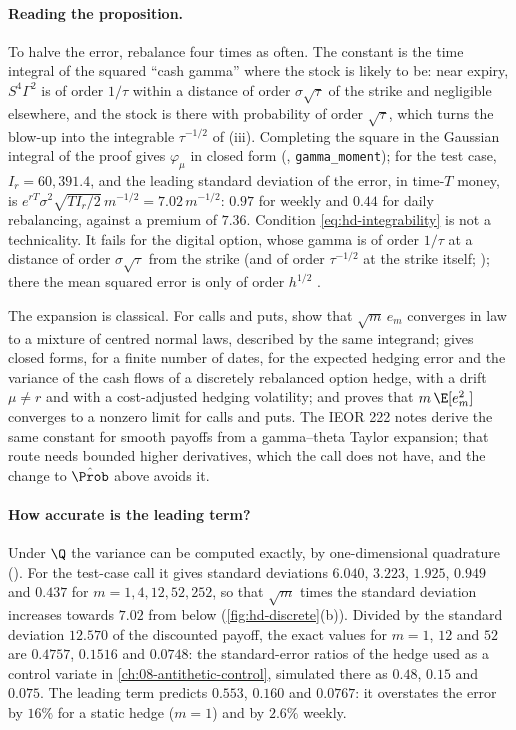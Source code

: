 \paragraph{Reading the proposition.} To halve the error, rebalance four times as often. The
constant is the time integral of the squared ``cash gamma'' where the stock is likely to be:
near expiry, $S^4\Gamma^2$ is of order $1/\tau$ within a distance of order $\sigma\sqrt\tau$ of the
strike and negligible elsewhere, and the stock is there with probability of order
$\sqrt\tau$, which turns the blow-up into the integrable $\tau^{-1/2}$ of (iii). Completing the
square in the Gaussian integral of the proof gives $\varphi_\mu$ in closed form
(, \texttt{gamma\_moment}); for the test case,
$I_r=60{,}391.4$, and the leading standard deviation of the error, in time-$T$ money, is
$e^{rT}\sigma^2\sqrt{TI_r/2}\,m^{-1/2}=7.02\,m^{-1/2}$: $0.97$ for weekly and $0.44$ for daily
rebalancing, against a premium of $7.36$. Condition \eqref{eq:hd-integrability} is not a
technicality. It fails for the digital option, whose gamma is of order $1/\tau$ at a distance of
order $\sigma\sqrt\tau$ from the strike (and of order $\tau^{-1/2}$ at the strike itself;
); there the mean squared error is only of order $h^{1/2}$
\citep[with the correction note of \citealp{gobet-correction}]{gobet-temam}.

The expansion is classical. For calls and puts, \textcite{bertsimas-kogan-lo} show that $\sqrt m\,e_m$
converges in law to a mixture of centred normal laws, described by the same integrand;
\textcite{toft-1996} gives closed forms, for a finite number of dates, for the expected hedging
error and the variance of the cash flows of a discretely rebalanced option hedge, with a drift
$\mu\ne r$ and with a cost-adjusted hedging volatility; and \textcite{zhang-thesis} proves that $m\,\E[e_m^2]$ converges to a nonzero
limit for calls and puts. The IEOR 222 notes derive the same constant for smooth payoffs from a gamma--theta
Taylor expansion; that route needs bounded higher derivatives, which the call does not have,
and the change to $\hat\Prob$ above avoids it.

\paragraph{How accurate is the leading term?} Under $\Q$ the variance can be computed exactly,
by one-dimensional quadrature (). For the test-case call it gives standard
deviations $6.040$, $3.223$, $1.925$, $0.949$ and $0.437$ for $m=1,4,12,52,252$, so that
$\sqrt m$ times the standard deviation increases towards $7.02$ from below
(\cref{fig:hd-discrete}(b)). Divided by the standard deviation $12.570$ of the discounted payoff,
the exact values for $m=1$, $12$ and $52$ are $0.4757$, $0.1516$ and $0.0748$: the standard-error
ratios of the hedge used as a control variate in \cref{ch:08-antithetic-control}, simulated
there as $0.48$, $0.15$ and $0.075$. The leading term predicts $0.553$, $0.160$ and $0.0767$: it
overstates the error by $16\%$ for a static hedge ($m=1$) and by $2.6\%$ weekly.

